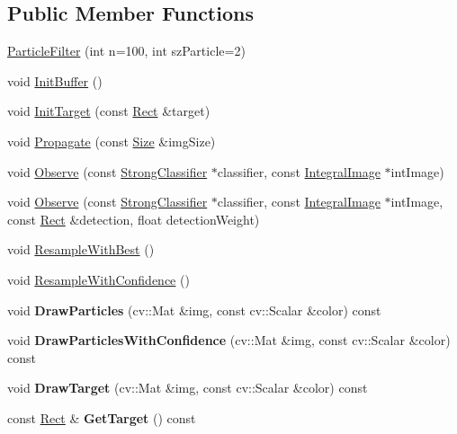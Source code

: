 \subsection*{Public Member Functions}
\begin{DoxyCompactItemize}
\item 
\hyperlink{classParticleFilter_ad05d7aeddc103fc32b6de3a751c37471}{Particle\+Filter} (int n=100, int sz\+Particle=2)
\item 
void \hyperlink{classParticleFilter_a3bf44906e7f1b546c96815856d330323}{Init\+Buffer} ()
\item 
void \hyperlink{classParticleFilter_afcde50511c90d318ec335bda8639c58f}{Init\+Target} (const \hyperlink{classRect}{Rect} \&target)
\item 
void \hyperlink{classParticleFilter_a166db9f33feabf14126df2de541a593d}{Propagate} (const \hyperlink{classSize}{Size} \&img\+Size)
\item 
void \hyperlink{classParticleFilter_a4529ea61cf9ab6ddd18f55434a4ff3b9}{Observe} (const \hyperlink{classStrongClassifier}{Strong\+Classifier} $\ast$classifier, const \hyperlink{classIntegralImage}{Integral\+Image} $\ast$int\+Image)
\item 
void \hyperlink{classParticleFilter_ad1ae015d78e510587c8928fa2ebcf9c0}{Observe} (const \hyperlink{classStrongClassifier}{Strong\+Classifier} $\ast$classifier, const \hyperlink{classIntegralImage}{Integral\+Image} $\ast$int\+Image, const \hyperlink{classRect}{Rect} \&detection, float detection\+Weight)
\item 
void \hyperlink{classParticleFilter_a76b01cd9d9d0fa181b89ffe3dcf5fbab}{Resample\+With\+Best} ()
\item 
void \hyperlink{classParticleFilter_ab191492fa8c67ecb0546e69d50fa2481}{Resample\+With\+Confidence} ()
\item 
\hypertarget{classParticleFilter_a666ab9bee3ed479c5e9387f8d5908e48}{}void {\bfseries Draw\+Particles} (cv\+::\+Mat \&img, const cv\+::\+Scalar \&color) const \label{classParticleFilter_a666ab9bee3ed479c5e9387f8d5908e48}

\item 
\hypertarget{classParticleFilter_a10b8f53b1f9245417ecab6f3dcb483e7}{}void {\bfseries Draw\+Particles\+With\+Confidence} (cv\+::\+Mat \&img, const cv\+::\+Scalar \&color) const \label{classParticleFilter_a10b8f53b1f9245417ecab6f3dcb483e7}

\item 
\hypertarget{classParticleFilter_ace5259baa39baccc26212d9ed116cf7c}{}void {\bfseries Draw\+Target} (cv\+::\+Mat \&img, const cv\+::\+Scalar \&color) const \label{classParticleFilter_ace5259baa39baccc26212d9ed116cf7c}

\item 
\hypertarget{classParticleFilter_ab2c226ecb5b701d7cac2c99cf6168e05}{}const \hyperlink{classRect}{Rect} \& {\bfseries Get\+Target} () const \label{classParticleFilter_ab2c226ecb5b701d7cac2c99cf6168e05}

\end{DoxyCompactItemize}
